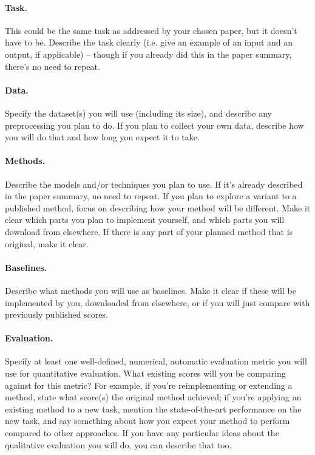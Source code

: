 \documentclass{article}
\begin{document}
\paragraph{Task.} 
This could be the same task as addressed by your chosen paper, but it doesn't have to be. Describe the task clearly (i.e. give an example of an input and an output, if applicable) -- though if you already did this in the paper summary, there's no need to repeat. 

\paragraph{Data.}
Specify the dataset(s) you will use (including its size), and describe any preprocessing you plan to do. If you plan to collect your own data, describe how you will do that and how long you expect it to take.

\paragraph{Methods.}
Describe the models and/or techniques you plan to use.
If it's already described in the paper summary, no need to repeat.
If you plan to explore a variant to a published method, focus on describing how your method will be different.
Make it clear which parts you plan to implement yourself, and which parts you will download from elsewhere. 
If there is any part of your planned method that is original, make it clear.

\paragraph{Baselines.}
Describe what methods you will use as baselines. Make it clear if these will be implemented by you, downloaded from elsewhere, or if you will just compare with previously published scores.

\paragraph{Evaluation.}
Specify at least one well-defined, numerical, automatic evaluation metric you will use for quantitative evaluation. 
What existing scores will you be comparing against for this metric? For example, if you're reimplementing or extending a method, state what score(s) the original method achieved; if you're applying an existing method to a new task, mention the state-of-the-art performance on the new task, and say something about how you expect your method to perform compared to other approaches.
If you have any particular ideas about the qualitative evaluation you will do, you can describe that too.
\end{document}
